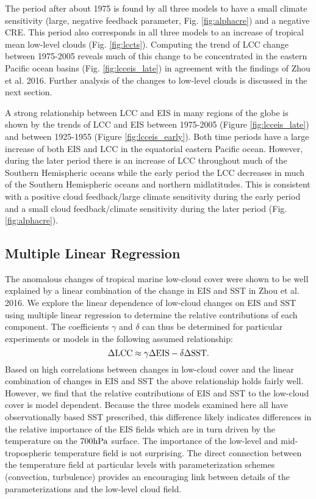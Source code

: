 \documentclass[grl]{agutex2015}
\begin{document}
\begin{article}
The period after about 1975 is found by all three models to have a small climate sensitivity (large, negative feedback parameter, Fig. \ref{fig:alphacre}) and a negative CRE.  This period also corresponds in all three models to an increase of tropical mean low-level clouds  (Fig. \ref{fig:lccts}).  Computing the trend of LCC change between 1975-2005 reveals much of this change to be concentrated in the eastern Pacific ocean basins (Fig. \ref{fig:lcceis_late}) in agreement with the findings of Zhou et al. 2016.  Further analysis of the changes to low-level clouds is discussed in the next section.    

A strong relationship between LCC and EIS in many regions of the globe is shown by the trends of LCC and EIS between 1975-2005 (Figure \ref{fig:lcceis_late}) and between 1925-1955 (Figure \ref{fig:lcceis_early}).  Both time periods have a large increase of both EIS and LCC in the equatorial eastern Pacific ocean.  However, during the later period there is an increase of LCC throughout much of the Southern Hemispheric oceans while the early period the LCC decreases in much of the Southern Hemispheric oceans and northern midlatitudes.  This is consistent with a positive cloud feedback/large climate sensitivity during the early period and a small cloud feedback/climate sensitivity during the later period (Fig. \ref{fig:alphacre}).

\subsection{Multiple Linear Regression}    

    The anomalous changes of tropical marine low-cloud cover were shown to be well explained by a linear combination of the change in EIS and SST in Zhou et al. 2016.  We explore the linear dependence of low-cloud changes on EIS and SST using multiple linear regression to determine the relative contributions of each component.  The coefficients $\gamma$ and $\delta$ can thus be determined for particular experiments or models in the following assumed relationship: 
    \begin{equation} 
    \Delta \rm{LCC} \approx \gamma \Delta \rm{EIS} - \delta \Delta \rm{SST}.
    \label{eqLCC}
    \end{equation}  
Based on high correlations between changes in low-cloud cover and the linear combination of changes in EIS and SST the above relationship holds fairly well.  However, we find that the relative contributions of EIS and SST to the low-cloud cover is model dependent.  Because the three models examined here all have observationally based SST prescribed, this difference likely indicates differences in the relative importance of the EIS fields which are in turn driven by the temperature on the $700 \rm{hPa}$ surface.  The importance of the low-level and mid-tropospheric temperature field is not surprising.  The direct connection between the temperature field at particular levels with parameterization schemes (convection, turbulence) provides an encouraging link between details of the parameterizations and the low-level cloud field.  
    

\end{article}
\end{document}
